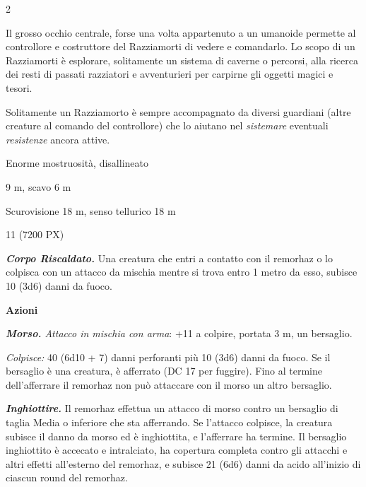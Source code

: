 \begin{multicols}{2}
{Il grosso occhio centrale, forse una volta appartenuto a un umanoide permette al controllore e costruttore del Razziamorti di vedere e comandarlo. Lo scopo di un Razziamorti è esplorare, solitamente un sistema di caverne o percorsi, alla ricerca dei resti di passati razziatori e avventurieri per carpirne gli oggetti magici e tesori.

Solitamente un Razziamorto è sempre accompagnato da diversi guardiani (altre creature al comando del controllore) che lo aiutano nel \emph{sistemare} eventuali \emph{resistenze} ancora attive.

\begin{description}[noitemsep, topsep=0pt, parsep=0pt, partopsep=0pt, itemsep=1pt, leftmargin=2.35cm,  labelwidth=2.2cm, itemindent=0cm, listparindent=0pt] %
\setlength{\baselineskip}{10pt}
\item[\textbf{Taglia/Tipo}] Enorme mostruosità, disallineato
\item[\textbf{Caratt.}] 
\item[\textbf{Punti Ferita}] 
\item[\textbf{Movimento}] 9 m, scavo 6 m
\item[\textbf{Tiri Salvez.}] 
\item[\textbf{Sensi}] Scurovisione 18 m, senso tellurico 18 m
\item[\textbf{Sfida}] 11 (7200 PX)
\end{description}
\smallskip

\emph{\textbf{Corpo Riscaldato.}} Una creatura che entri a contatto con il remorhaz o lo colpisca con un attacco da mischia mentre si trova entro 1 metro da esso, subisce 10 (3d6) danni da fuoco.

\textbf{Azioni}

\emph{\textbf{Morso.} Attacco in mischia con arma}: +11 a colpire, portata 3 m, un bersaglio.

\emph{Colpisce:} 40 (6d10 + 7) danni perforanti più 10 (3d6) danni da fuoco. Se il bersaglio è una creatura, è afferrato (DC 17 per fuggire). Fino al termine dell'afferrare  il remorhaz non può attaccare con il morso un altro bersaglio.

\emph{\textbf{Inghiottire.}} Il remorhaz effettua un attacco di morso contro un bersaglio di taglia Media o inferiore che sta afferrando. Se l'attacco colpisce, la creatura subisce il danno da morso ed è inghiottita, e l'afferrare ha termine. Il bersaglio inghiottito è accecato e intralciato, ha copertura completa contro gli attacchi e altri effetti all'esterno del remorhaz, e subisce 21 (6d6) danni da acido all'inizio di ciascun round del remorhaz.

}
\end{multicols}
